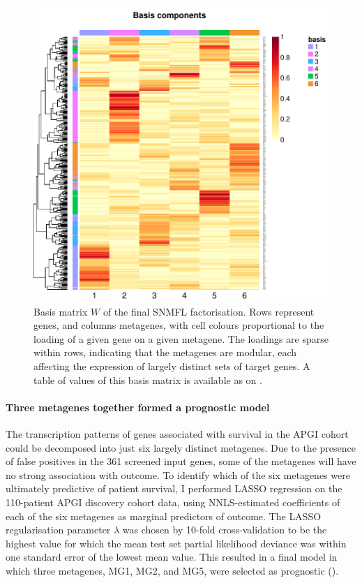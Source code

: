 \documentclass[dissertation.tex]{subfiles}
\begin{document}
\begin{figure}[!htbp]
\centering
\includegraphics[width=\linewidth]{analysis/biosurv/reports/18_SIS_diag_dsd_final/figure/nmf-plots-2}
\caption[Basis matrix \texorpdfstring{$W$}{W} of the final \texorpdfstring{\acrshort{SNMFL}}{SNMF/L} factorisation]{Basis matrix $W$ of the final \acrshort{SNMFL} factorisation.  Rows represent genes, and columns metagenes, with cell colours proportional to the loading of a given gene on a given metagene.  The loadings are sparse within rows, indicating that the metagenes are modular, each affecting the expression of largely distinct sets of target genes.  A table of values of this basis matrix is available as  on .}\label{fig:sigs-nmf-basis}
\end{figure}

\paragraph{Three metagenes together formed a prognostic model}
The transcription patterns of genes associated with survival in the \gls{APGI} cohort could be decomposed into just six largely distinct metagenes.  Due to the presence of false positives in the 361 screened input genes, some of the metagenes will have no strong association with outcome.  To identify which of the six metagenes were ultimately predictive of patient survival, I performed \gls{LASSO} regression on the 110-patient \gls{APGI} discovery cohort data, using \gls{NNLS}-estimated coefficients of each of the six metagenes as marginal predictors of outcome.  The \gls{LASSO} regularisation parameter $\lambda$ was chosen by 10-fold cross-validation to be the highest value for which the mean test set partial likelihood deviance was within one standard error of the lowest mean value.  This resulted in a final model in which three metagenes, MG1, MG2, and MG5, were selected as prognostic ().
\end{document}
